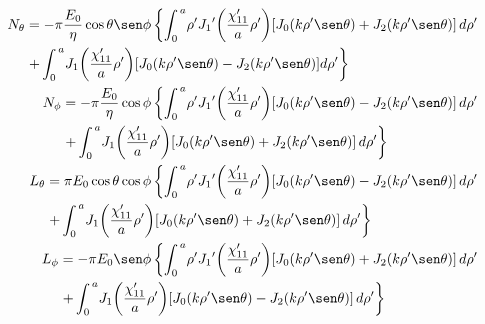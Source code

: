 \begin{subequations}
\label{grup_ec_apC:19}
\begin{align}
\begin{split}
N_{\theta} &= - \pi\dfrac{E_0}{\eta}\cos\theta\sen\phi\left\{\int_{0}^{\,a}\!\rho '{J_1}'\!\left(\frac{\chi '_{11}}{a}\rho '\right)\!\left[J_0\!\left(k\rho '\sen\theta\right) + J_2\!\left(k\rho '\sen\theta\right)\right]d\rho '\right.\\
&\left.+\int_{0}^{\,a}\!J_1\!\left(\frac{\chi '_{11}}{a}\rho '\right)\!\left[J_0\!\left(k\rho '\sen\theta\right) - J_2\!\left(k\rho '\sen\theta\right)\right]\!d\rho '\right\}
\end{split}
\label{ec_apC:81}\\
\begin{split}
N_{\phi} &= - \pi\dfrac{E_0}{\eta}\cos\phi\left\{\int_{0}^{\,a}\!\rho '{J_1}'\!\left(\frac{\chi '_{11}}{a}\rho '\right)\!\left[J_0\!\left(k\rho '\sen\theta\right) - J_2\!\left(k\rho '\sen\theta\right)\right]d\rho '\right.\\
&\left.+\int_{0}^{\,a}\!J_1\!\left(\frac{\chi '_{11}}{a}\rho '\right)\!\left[J_0\!\left(k\rho '\sen\theta\right) + J_2\!\left(k\rho '\sen\theta\right)\right]d\rho '\right\}
\end{split}
\label{ec_apC:82}\\
\begin{split}
L_{\theta}  &= \pi E_0\cos\theta\cos\phi\left\{\int_{0}^{\,a}\!\rho '{J_1}'\!\left(\frac{\chi '_{11}}{a}\rho '\right)\!\left[J_0\!\left(k\rho '\sen\theta\right) - J_2\!\left(k\rho '\sen\theta\right)\right]d\rho '\right.\\
&\left.+\int_{0}^{\,a}\!J_1\!\left(\frac{\chi '_{11}}{a}\rho '\right)\!\left[J_0\!\left(k\rho '\sen\theta\right) + J_2\!\left(k\rho '\sen\theta\right)\right]d\rho '\right\}
\end{split}
\label{ec_apC:83}\\
\begin{split}
L_{\phi} &= - \pi E_0\sen\phi\left\{\int_{0}^{\,a}\!\rho '{J_1}'\!\left(\frac{\chi '_{11}}{a}\rho '\right)\!\left[J_0\!\left(k\rho '\sen\theta\right) + J_2\!\left(k\rho '\sen\theta\right)\right]d\rho '\right.\\
&\left.+\int_{0}^{\,a}\!J_1\!\left(\frac{\chi '_{11}}{a}\rho '\right)\!\left[J_0\!\left(k\rho '\sen\theta\right) - J_2\!\left(k\rho '\sen\theta\right)\right]d\rho '\right\}
\end{split}
\label{ec_apC:84}
\end{align}
\end{subequations}
